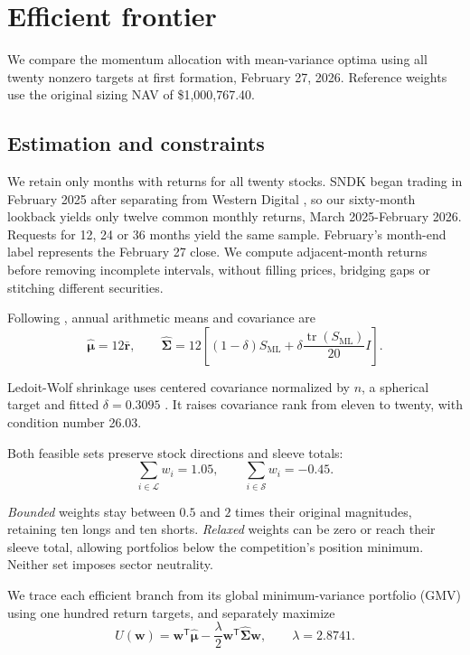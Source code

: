 \section{Efficient frontier}
\label{sec:frontier}

We compare the momentum allocation with mean-variance optima using all twenty
nonzero targets at first formation, February 27, 2026. Reference weights use
the original sizing NAV of \$1,000,767.40.

\subsection{Estimation and constraints}

We retain only months with returns for all twenty stocks. SNDK began trading
in February 2025 after separating from Western Digital \citep{wdc2025sandisk},
so our sixty-month lookback yields only twelve common monthly returns,
March 2025-February 2026. Requests for 12, 24 or 36 months yield the same sample.
February's month-end label represents the February 27 close. We compute adjacent-month returns before
removing incomplete intervals, without filling prices, bridging gaps or
stitching different securities.

Following \citet{markowitz1952}, annual arithmetic means and covariance are
\begin{equation}
 \widehat{\boldsymbol\mu}=12\bar{\mathbf r},
 \qquad
 \widehat{\boldsymbol\Sigma}
 =12\left[(1-\delta)S_{\mathrm{ML}}
 +\delta\frac{\operatorname{tr}(S_{\mathrm{ML}})}{20}I\right].
\end{equation}

Ledoit-Wolf shrinkage uses centered covariance normalized by $n$, a spherical
target and fitted $\delta=0.3095$ \citep{ledoitwolf2004,sklearncovariance}.
It raises covariance rank from eleven to twenty, with condition number 26.03.

Both feasible sets preserve stock directions and sleeve totals:
\begin{equation}
  \sum_{i\in\mathcal L}w_i=1.05,
  \qquad \sum_{i\in\mathcal S}w_i=-0.45.
\end{equation}

\emph{Bounded} weights stay between $0.5$ and $2$ times their original
magnitudes, retaining ten longs and ten shorts. \emph{Relaxed} weights can be
zero or reach their sleeve total, allowing portfolios below the competition's
position minimum. Neither set imposes sector neutrality.

We trace each efficient branch from its global minimum-variance portfolio
(GMV) using one hundred return targets, and separately maximize
\begin{equation}
 U(\mathbf w)=\mathbf w^{\mathsf T}\widehat{\boldsymbol\mu}
 -\frac{\lambda}{2}\mathbf w^{\mathsf T}\widehat{\boldsymbol\Sigma}\mathbf w,
 \qquad \lambda=2.8741.
\end{equation}

